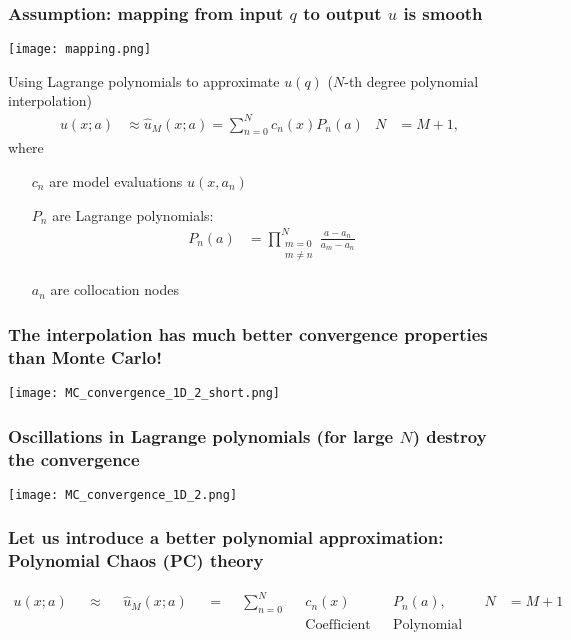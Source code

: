 \documentclass[handout]{beamer}
\begin{document}
\begin{frame}
  \frametitle{Assumption: mapping from input $q$ to output $u$ is smooth}
  \begin{center}
   \texttt{[image: mapping.png]}
  \end{center}
\end{frame}

\begin{frame}[fragile]{Using Lagrange polynomials to approximate $u(q)$ ($N$-th degree polynomial interpolation)}{}
    \begin{align*}
        u(x;a) &\approx \hat u_M(x;a) =
        \sum_{n=0}^N c_n(x) P_n(a) & N&=M+1,
    \end{align*}
    where
    \begin{itemize}
        \item[$c_n$] are model evaluations $u(x, a_n)$
        \item[$P_n$] are Lagrange polynomials:
            \begin{align*}
                P_n(a) &= \prod_{\substack{m=0 \\ m\neq n}}^N \frac{a-a_n}{a_m-a_n}
            \end{align*}
        \item[$a_n$] are collocation nodes
    \end{itemize}
\end{frame}

\begin{frame}
  \frametitle{The interpolation has much better convergence properties than Monte Carlo!}
  \begin{center}
    \texttt{[image: MC\_convergence\_1D\_2\_short.png]}
  \end{center}
\end{frame}

\begin{frame}
  \frametitle{Oscillations in Lagrange polynomials (for large $N$) destroy the convergence}
  \begin{center}
    \texttt{[image: MC\_convergence\_1D\_2.png]}
  \end{center}
\end{frame}


\begin{frame}
  \frametitle{Let us introduce a better polynomial approximation: Polynomial Chaos (PC) theory}
  \begin{align*}
      u(x;a) & &\approx && \hat u_M(x;a) && =
      && \sum_{n=0}^N && c_n(x)\quad && P_n(a),\quad && N &= M+1\\
      &&  &&  &&  &&  && \text{Coefficient} && \text{Polynomial}
  \end{align*}
\end{frame}
\end{document}
